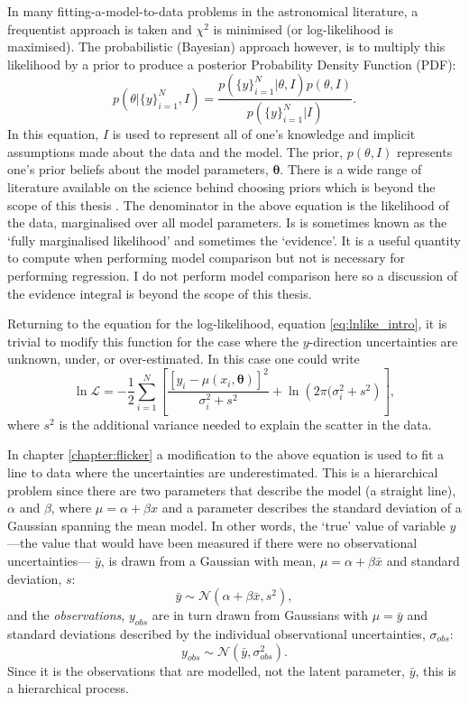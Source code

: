 In many fitting-a-model-to-data problems in the astronomical literature, a
frequentist approach is taken and $\chi^2$ is minimised (or log-likelihood is
maximised).
The probabilistic (Bayesian) approach however, is to multiply this likelihood
by a prior to produce a posterior Probability Density Function (PDF):
\begin{equation}
    p(\theta|\{y\}_{i=1}^N, I) = \frac{p(\{y\}_{i=1}^N|\theta, I)
    p(\theta, I)}{p(\{y\}_{i=1}^N|I)}.
\end{equation}
In this equation, $I$ is used to represent all of one's knowledge and
implicit assumptions made about the data and the model.
The prior, $p(\theta, I)$ represents one's prior beliefs about the model
parameters, $\mathbf{\theta}$.
There is a wide range of literature available on the science behind choosing
priors which is beyond the scope of this thesis \citep[\eg][]{Kass1996,
Gelman2009, Vanderplas2014}.
The denominator in the above equation is the likelihood of the data,
marginalised over all model parameters.
Is is sometimes known as the `fully marginalised likelihood' and sometimes the
`evidence'.
It is a useful quantity to compute when performing model comparison but not
is necessary for performing regression.
I do not perform model comparison here so a discussion of the evidence
integral is beyond the scope of this thesis.

Returning to the equation for the log-likelihood, equation
\ref{eq:lnlike_intro}, it is trivial to modify this function for the case
where the $y$-direction uncertainties are unknown, under, or over-estimated.
In this case one could write
\begin{equation}
    \ln\mathcal{L} =
    -\frac{1}{2} \sum_{i=1}^N \left[\frac{[y_i - \mu(x_i,
    \mathbf{\theta})]^2}{\sigma_i^2 + s^2} +
    \ln\left(2\pi(\sigma_i^2 + s^2\right) \right],
\end{equation}
where $s^2$ is the additional variance needed to explain the scatter in the
data.

In chapter \ref{chapter:flicker} a modification to the above equation is used
to fit a line to data where the uncertainties are underestimated.
This is a hierarchical problem since there are two parameters that describe
the model (a straight line), $\alpha$ and $\beta$, where $\mu = \alpha +
\beta x$ and a parameter describes the standard deviation of a Gaussian
spanning the mean model.
In other words, the `true' value of variable $y$---the value that would have
been measured if there were no observational uncertainties---
$\bar{y}$, is drawn from a Gaussian with mean, $\mu = \alpha + \beta \bar{x}$
and standard deviation, $s$:
\begin{equation}
\bar{y} \sim \mathcal{N}(\alpha + \beta\bar{x}, s^2),
\end{equation}
and the {\it observations}, $y_{obs}$ are in turn drawn from Gaussians with
$\mu = \bar{y}$ and standard deviations described by the individual
observational uncertainties, $\sigma_{obs}$:
\begin{equation}
y_{obs} \sim \mathcal{N}(\bar{y}, \sigma_{obs}^2).
\end{equation}
Since it is the observations that are modelled, not the latent parameter,
$\bar{y}$, this is a hierarchical process.

